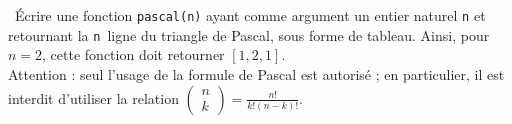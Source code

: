 \exer{}
\setcounter{numques}{0}

\question\ Écrire une fonction \texttt{pascal(n)} ayant comme argument un entier naturel \texttt{n}
et retournant la \texttt{n}\ieme\ ligne du triangle de Pascal, sous forme de tableau. Ainsi, pour $n=2$, cette fonction doit retourner $[1,2,1]$.\\
Attention : seul l'usage de la formule de Pascal est autorisé ; en particulier,
il est interdit d'utiliser la relation
$\begin{pmatrix}n\\k\end{pmatrix}=\displaystyle\frac{n!}{k!(n-k)!}$.
